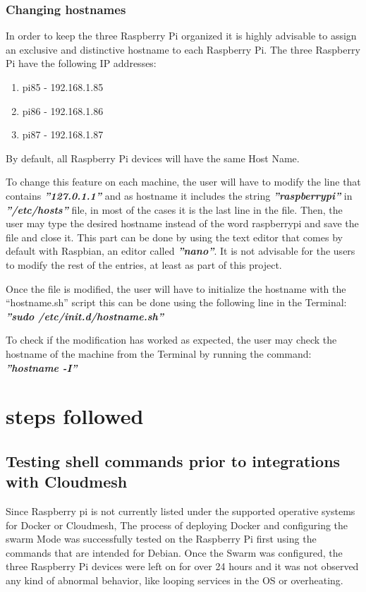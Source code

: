 \documentclass[sigconf]{acmart}
\begin{document}
	\subsubsection{Changing hostnames}
	In order to keep the three Raspberry Pi organized it is highly advisable to assign an exclusive and distinctive hostname to each Raspberry Pi.
The three Raspberry Pi have the following IP addresses:

\begin{enumerate}
	\item pi85 -  192.168.1.85
	\item pi86 -  192.168.1.86
	\item pi87 -  192.168.1.87
\end{enumerate}

	By default, all Raspberry Pi devices will have the same Host Name.
	
	To change this feature on each machine, the user will have to modify the line that contains \textbf{\textit{''127.0.1.1''}}  and as hostname it includes the string \textbf{\textit{''raspberrypi''}} in \textbf{\textit{''/etc/hosts''}} file, in most of the cases it is the last line in the file. Then, the user may type the desired hostname instead of the word raspberrypi and save the file and close it. This part can be done by using the text editor that comes by default with Raspbian, an editor called \textbf{\textit{''nano''}}.
	It is not advisable for the users to modify the rest of the entries, at least as part of this project.
	
	Once the file is modified, the user will have to initialize the hostname with the “hostname.sh” script this can be done using the following line in the Terminal: \textbf{\textit{''sudo /etc/init.d/hostname.sh''}}
	
	To check if the modification has worked  as expected, the user may check the hostname of the machine from the Terminal by running the command: \textbf{\textit{''hostname -I''}}
	
	\section{steps followed}
		
	\subsection{Testing shell commands prior to integrations with Cloudmesh}
	
	Since Raspberry pi is not currently listed under the supported operative systems for Docker or Cloudmesh, The process of deploying Docker and configuring the swarm Mode was successfully tested on the Raspberry Pi first using the commands that are intended for Debian. Once the Swarm was configured, the three Raspberry Pi devices were left on for over 24 hours and it was not observed any kind of abnormal behavior, like looping services in the OS or overheating.
		
\end{document}
